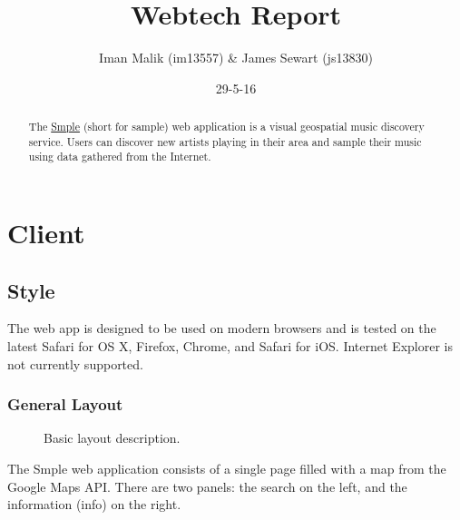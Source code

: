 \documentclass[10pt]{article}
\title{Webtech Report}
\author{Iman Malik (im13557) \& James Sewart (js13830)}
\date{29-5-16}
\begin{document}
    \maketitle

    \tableofcontents


    \begin{abstract}
        The \href{https://smple.uk}{Smple} (short for sample) web application is a visual geospatial music discovery service. Users can discover new artists playing in their area and sample their music using data gathered from the Internet.
    \end{abstract}

    \section{Client}
        \subsection{Style}
            The web app is designed to be used on modern browsers and is tested on the latest Safari for OS X, Firefox, Chrome, and Safari for iOS. Internet Explorer is not currently supported.
            \subsubsection{General Layout}
                \begin{figure}[!ht]
                  \centering
                  \caption{Basic layout description.}
                \end{figure}

                The Smple web application consists of a single page filled with a map from the Google Maps API. There are two panels: the search on the left, and the information (info) on the right. 
\end{document}
